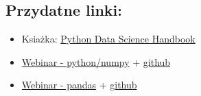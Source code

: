 \documentclass[11pt]{article}
\makeatletter
\providecommand{\tightlist}{%
      \setlength{\itemsep}{0pt}\setlength{\parskip}{0pt}}
\newcommand{\boxspacing}{\kern\kvtcb@left@rule\kern\kvtcb@boxsep}
\newcommand{\prompt}[4]{
        \ttfamily\llap{{\color{#2}[#3]:\hspace{3pt}#4}}\vspace{-\baselineskip}
    }
\makeatother
\begin{document}
    \hypertarget{przydatne-linki}{%
\subsection{Przydatne linki:}\label{przydatne-linki}}

\begin{itemize}
\tightlist
\item
  Ksiażka: \href{https://bit.ly/31ubHFw}{Python Data Science Handbook}
\item
  \href{https://bit.ly/3cwans0}{Webinar - python/numpy} +
  \href{https://bit.ly/3u58eJQ}{github}
\item
  \href{https://bit.ly/3dcQd5r}{Webinar - pandas} +
  \href{https://bit.ly/3u2jMxb}{github}
\end{itemize}

    \begin{tcolorbox}[breakable, size=fbox, boxrule=1pt, pad at break*=1mm,colback=cellbackground, colframe=cellborder]
\prompt{In}{incolor}{ }{\boxspacing}
\begin{Verbatim}[commandchars=\\\{\}]

\end{Verbatim}
\end{tcolorbox}


    
    
    
\end{document}
